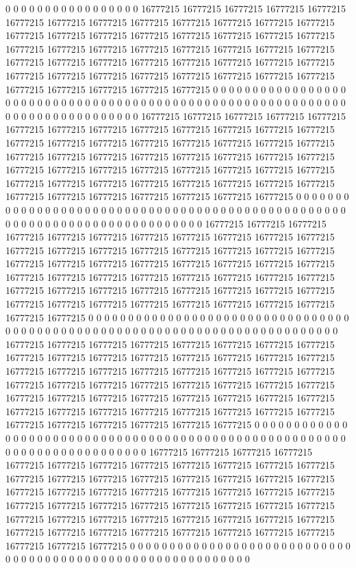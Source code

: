 0 0 0 0 0 0 0 0 0 0 0 0 0 0 0 0 0 16777215 16777215 16777215 16777215 16777215 16777215 16777215 16777215 16777215 16777215 16777215 16777215 16777215 16777215 16777215 16777215 16777215 16777215 16777215 16777215 16777215 16777215 16777215 16777215 16777215 16777215 16777215 16777215 16777215 16777215 16777215 16777215 16777215 16777215 16777215 16777215 16777215 16777215 16777215 16777215 16777215 16777215 16777215 16777215 16777215 16777215 16777215 16777215 16777215 16777215 0 0 0 0 0 0 0 0 0 0 0 0 0 0 0 0 0 0 0 0 0 0 0 0 0 0 0 0 0 0 0 0 0 0 0 0 0 0 0 0 0 0 0 0 0 0 0 0 0 0 0 0 0 0 0 0 0 0 0 0 0
0 0 0 0 0 0 0 0 0 0 0 0 0 0 0 0 16777215 16777215 16777215 16777215 16777215 16777215 16777215 16777215 16777215 16777215 16777215 16777215 16777215 16777215 16777215 16777215 16777215 16777215 16777215 16777215 16777215 16777215 16777215 16777215 16777215 16777215 16777215 16777215 16777215 16777215 16777215 16777215 16777215 16777215 16777215 16777215 16777215 16777215 16777215 16777215 16777215 16777215 16777215 16777215 16777215 16777215 16777215 16777215 16777215 16777215 16777215 16777215 0 0 0 0 0 0 0 0 0 0 0 0 0 0 0 0 0 0 0 0 0 0 0 0 0 0 0 0 0 0 0 0 0 0 0 0 0 0 0 0 0 0 0 0 0 0 0 0 0 0 0 0 0 0 0 0 0 0 0 0
0 0 0 0 0 0 0 0 0 0 0 0 0 0 0 16777215 16777215 16777215 16777215 16777215 16777215 16777215 16777215 16777215 16777215 16777215 16777215 16777215 16777215 16777215 16777215 16777215 16777215 16777215 16777215 16777215 16777215 16777215 16777215 16777215 16777215 16777215 16777215 16777215 16777215 16777215 16777215 16777215 16777215 16777215 16777215 16777215 16777215 16777215 16777215 16777215 16777215 16777215 16777215 16777215 16777215 16777215 16777215 16777215 16777215 16777215 16777215 16777215 0 0 0 0 0 0 0 0 0 0 0 0 0 0 0 0 0 0 0 0 0 0 0 0 0 0 0 0 0 0 0 0 0 0 0 0 0 0 0 0 0 0 0 0 0 0 0 0 0 0 0 0 0 0 0 0 0 0 0 0
0 0 0 0 0 0 0 0 0 0 0 0 0 0 0 16777215 16777215 16777215 16777215 16777215 16777215 16777215 16777215 16777215 16777215 16777215 16777215 16777215 16777215 16777215 16777215 16777215 16777215 16777215 16777215 16777215 16777215 16777215 16777215 16777215 16777215 16777215 16777215 16777215 16777215 16777215 16777215 16777215 16777215 16777215 16777215 16777215 16777215 16777215 16777215 16777215 16777215 16777215 16777215 16777215 16777215 16777215 16777215 16777215 16777215 16777215 16777215 16777215 16777215 0 0 0 0 0 0 0 0 0 0 0 0 0 0 0 0 0 0 0 0 0 0 0 0 0 0 0 0 0 0 0 0 0 0 0 0 0 0 0 0 0 0 0 0 0 0 0 0 0 0 0 0 0 0 0 0 0 0 0
0 0 0 0 0 0 0 0 0 0 0 0 0 0 16777215 16777215 16777215 16777215 16777215 16777215 16777215 16777215 16777215 16777215 16777215 16777215 16777215 16777215 16777215 16777215 16777215 16777215 16777215 16777215 16777215 16777215 16777215 16777215 16777215 16777215 16777215 16777215 16777215 16777215 16777215 16777215 16777215 16777215 16777215 16777215 16777215 16777215 16777215 16777215 16777215 16777215 16777215 16777215 16777215 16777215 16777215 16777215 16777215 16777215 16777215 16777215 16777215 16777215 16777215 0 0 0 0 0 0 0 0 0 0 0 0 0 0 0 0 0 0 0 0 0 0 0 0 0 0 0 0 0 0 0 0 0 0 0 0 0 0 0 0 0 0 0 0 0 0 0 0 0 0 0 0 0 0 0 0 0 0 0
